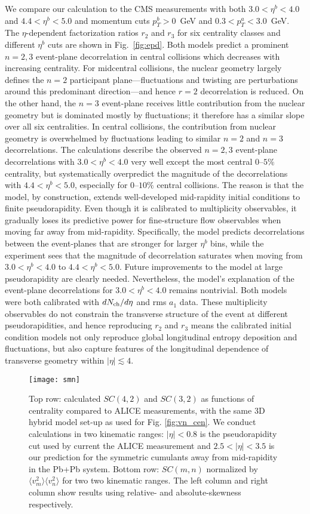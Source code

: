 We compare our calculation to the CMS measurements with both $3.0 < \eta^b < 4.0$ and $4.4 < \eta^b < 5.0$ and momentum cuts $p_T^b > 0$~GeV and ${0.3 < p_T^a < 3.0}$~GeV.
The $\eta$-dependent factorization ratios $r_2$ and $r_3$ for six centrality classes and different $\eta^b$ cuts are shown in Fig.~\ref{fig:epd}.
Both models predict a prominent $n=2, 3$ event-plane decorrelation in central collisions which decreases with increasing centrality.
For midcentral collisions, the nuclear geometry largely defines the $n=2$ participant plane---fluctuations and twisting are perturbations around this predominant direction---and hence $r=2$ decorrelation is reduced.
On the other hand, the $n=3$ event-plane receives little contribution from the nuclear geometry but is dominated mostly by fluctuations; it therefore has a similar slope over all six centralities.
In central collisions, the contribution from nuclear geometry is overwhelmed by fluctuations leading to similar $n=2$ and $n=3$ decorrelations.
The calculations describe the observed $n=2,3$ event-plane decorrelations with $3.0 < \eta^b < 4.0$ very well except the most central $0$--$5\%$ centrality, but systematically overpredict the magnitude of the decorrelations with $4.4 < \eta^b < 5.0$, especially for $0$--$10\%$ central collisions.
The reason is that the model, by construction, extends well-developed mid-rapidity initial conditions to finite pseudorapidity. 
Even though it is calibrated to multiplicity observables, it gradually loses its predictive power for fine-structure flow observables when moving far away from mid-rapidity.
Specifically, the model predicts decorrelations between the event-planes that are stronger for larger $\eta^b$ bins, while the experiment sees that the magnitude of decorrelation saturates when moving from $3.0<\eta^b<4.0$ to $4.4<\eta^b<5.0$.
Future improvements to the model at large pseudorapidity are clearly needed.
Nevertheless, the model's explanation of the event-plane decorrelations for $3.0 < \eta^b < 4.0$ remains nontrivial.
Both models were both calibrated with $dN_\text{ch}/d\eta$ and rms $a_1$ data.
These multiplicity observables do not constrain the transverse structure of the event at different pseudorapidities, and hence reproducing $r_2$ and $r_3$ means the calibrated initial condition models not only reproduce global longitudinal entropy deposition and fluctuations, but also capture features of the longitudinal dependence of transverse geometry within $|\eta| \lesssim 4$.


\begin{figure*}
  \texttt{[image: smn]}
  \caption{Top row: calculated $SC(4,2)$ and $SC(3,2)$ as functions of centrality compared to ALICE measurements, with the same 3D hybrid model set-up as used for Fig. \ref{fig:vn_cen}.
  We conduct calculations in two kinematic ranges: $|\eta|<0.8$ is the pseudorapidity cut used by current the ALICE measurement and $2.5<|\eta|<3.5$ is our prediction for the symmetric cumulants away from mid-rapidity in the Pb+Pb system.
  Bottom row: $SC(m,n)$ normalized by $\langle v_m^2\rangle\langle v_n^2\rangle$ for two two kinematic ranges.
  The left column and right column show results using relative- and absolute-skewness respectively.
   }
  \label{fig:smn} 
\end{figure*}


